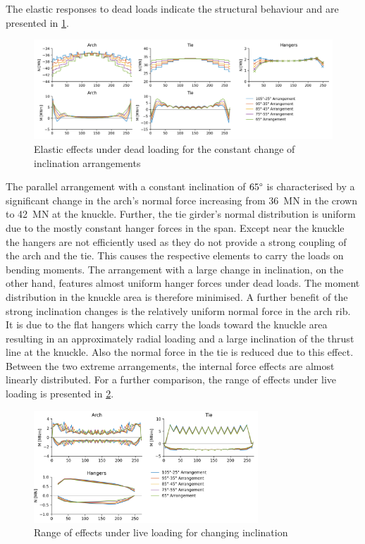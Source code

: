 The elastic responses to dead loads indicate the structural behaviour and are presented in \cref{fig:change_live}.

\begin{figure}[H]
    \centering
    \includegraphics[trim={0 0 0 0},clip, width=\textwidth]{calculations/constant change arrangement/dead load.png}
    \caption{Elastic effects under dead loading for the constant change of inclination arrangements}
    \label{fig:change_live}
\end{figure}

The parallel arrangement with a constant inclination of $65\degree$ is characterised by a significant change in the arch's normal force increasing from \SI{36}{MN} in the crown to \SI{42}{MN} at the knuckle. Further, the tie girder's normal distribution is uniform due to the mostly constant hanger forces in the span. Except near the knuckle the hangers are not efficiently used as they do not provide a strong coupling of the arch and the tie. This causes the respective elements to carry the loads on bending moments. The arrangement with a large change in inclination, on the other hand, features almost uniform hanger forces under dead loads. The moment distribution in the knuckle area is therefore minimised. A further benefit of the strong inclination changes is the relatively uniform normal force in the arch rib. It is due to the flat hangers which carry the loads toward the knuckle area resulting in an approximately radial loading and a large inclination of the thrust line at the knuckle. Also the normal force in the tie is reduced due to this effect.
Between the two extreme arrangements, the internal force effects are almost linearly distributed. For a further comparison, the range of effects under live loading is presented in \cref{fig:c_inclination_live}.

\begin{figure}[H]
    \centering
    \includegraphics[trim={0 0 0 0},clip, width=0.75\textwidth]{calculations/constant change arrangement/live loading_plot.png}
    \caption{Range of effects under live loading for changing inclination}
    \label{fig:c_inclination_live}
\end{figure}


